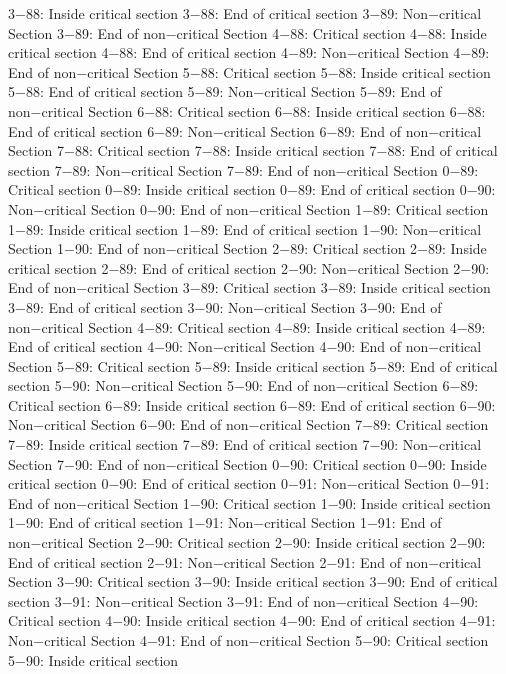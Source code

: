 3−88: Inside critical section
3−88: End of critical section
3−89: Non−critical Section
3−89: End of non−critical Section
4−88: Critical section
4−88: Inside critical section
4−88: End of critical section
4−89: Non−critical Section
4−89: End of non−critical Section
5−88: Critical section
5−88: Inside critical section
5−88: End of critical section
5−89: Non−critical Section
5−89: End of non−critical Section
6−88: Critical section
6−88: Inside critical section
6−88: End of critical section
6−89: Non−critical Section
6−89: End of non−critical Section
7−88: Critical section
7−88: Inside critical section
7−88: End of critical section
7−89: Non−critical Section
7−89: End of non−critical Section
0−89: Critical section
0−89: Inside critical section
0−89: End of critical section
0−90: Non−critical Section
0−90: End of non−critical Section
1−89: Critical section
1−89: Inside critical section
1−89: End of critical section
1−90: Non−critical Section
1−90: End of non−critical Section
2−89: Critical section
2−89: Inside critical section
2−89: End of critical section
2−90: Non−critical Section
2−90: End of non−critical Section
3−89: Critical section
3−89: Inside critical section
3−89: End of critical section
3−90: Non−critical Section
3−90: End of non−critical Section
4−89: Critical section
4−89: Inside critical section
4−89: End of critical section
4−90: Non−critical Section
4−90: End of non−critical Section
5−89: Critical section
5−89: Inside critical section
5−89: End of critical section
5−90: Non−critical Section
5−90: End of non−critical Section
6−89: Critical section
6−89: Inside critical section
6−89: End of critical section
6−90: Non−critical Section
6−90: End of non−critical Section
7−89: Critical section
7−89: Inside critical section
7−89: End of critical section
7−90: Non−critical Section
7−90: End of non−critical Section
0−90: Critical section
0−90: Inside critical section
0−90: End of critical section
0−91: Non−critical Section
0−91: End of non−critical Section
1−90: Critical section
1−90: Inside critical section
1−90: End of critical section
1−91: Non−critical Section
1−91: End of non−critical Section
2−90: Critical section
2−90: Inside critical section
2−90: End of critical section
2−91: Non−critical Section
2−91: End of non−critical Section
3−90: Critical section
3−90: Inside critical section
3−90: End of critical section
3−91: Non−critical Section
3−91: End of non−critical Section
4−90: Critical section
4−90: Inside critical section
4−90: End of critical section
4−91: Non−critical Section
4−91: End of non−critical Section
5−90: Critical section
5−90: Inside critical section
